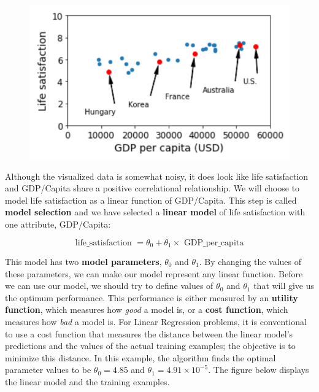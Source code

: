     \begin{figure}[hbt!]
        \centering
        \includegraphics{Resources/Model_based_learning_2}
    \end{figure}

    \noindent Although the visualized data is somewhat noisy, it does look like life satisfaction and
    GDP/Capita share a positive correlational relationship. We will choose to model life satisfaction as a
    linear function of GDP/Capita. This step is called \textbf{model selection} and we have selected a
    \textbf{linear model} of life satisfaction with one attribute, GDP/Capita:

    \begin{equation*}
        \text{life\_satisfaction } = \theta_0 + \theta_1 \times \text{ GDP\_per\_capita}
    \end{equation*}

    \noindent This model has two \textbf{model parameters}, $\theta_0$ and $\theta_1$. By changing the values
    of these parameters, we can make our model represent any linear function. Before we can use our model,
    we should try to define values of $\theta_0$ and $\theta_1$ that will give us the optimum performance.
    This performance is either measured by an \textbf{utility function}, which measures how \textit{good} a
    model is, or a \textbf{cost function}, which measures how \textit{bad} a model is. For Linear Regression
    problems, it is conventional to use a cost function that measures the distance between the linear model's
    predictions and the values of the actual training examples; the objective is to minimize this distance.
    In this example, the algorithm finds the optimal parameter values to be $\theta_0=4.85$ and
    $\theta_1=4.91\times 10^{-5}$. The figure below displays the linear model and the training examples.

